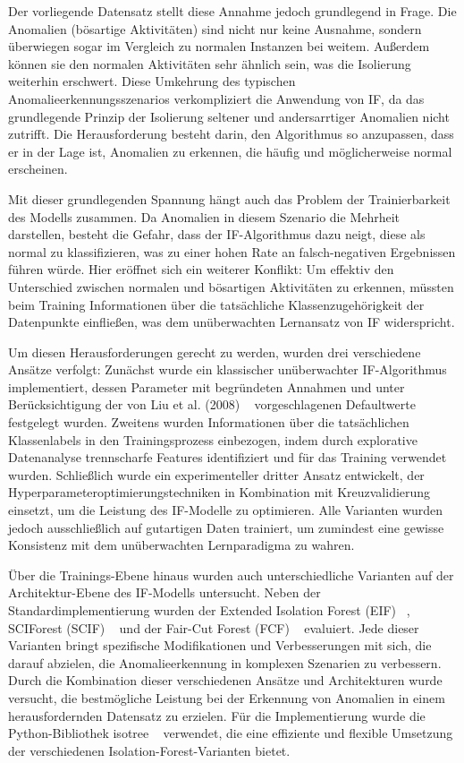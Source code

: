\documentclass[12pt,oneside]{article}
\begin{document}
	Der vorliegende Datensatz stellt diese Annahme jedoch grundlegend in Frage. Die Anomalien (bösartige Aktivitäten) sind nicht nur keine Ausnahme, sondern überwiegen sogar im Vergleich zu normalen Instanzen bei weitem. Außerdem können sie den normalen Aktivitäten sehr ähnlich sein, was die Isolierung weiterhin erschwert. Diese Umkehrung des typischen Anomalieerkennungsszenarios verkompliziert die Anwendung von IF, da das grundlegende Prinzip der Isolierung seltener und andersarrtiger Anomalien nicht zutrifft. Die Herausforderung besteht darin, den Algorithmus so anzupassen, dass er in der Lage ist, Anomalien zu erkennen, die häufig und möglicherweise normal erscheinen.

	Mit dieser grundlegenden Spannung hängt auch das Problem der Trainierbarkeit des Modells zusammen. Da Anomalien in diesem Szenario die Mehrheit darstellen, besteht die Gefahr, dass der IF-Algorithmus dazu neigt, diese als normal zu klassifizieren, was zu einer hohen Rate an falsch-negativen Ergebnissen führen würde.
	Hier eröffnet sich ein weiterer Konflikt: Um effektiv den Unterschied zwischen normalen und bösartigen Aktivitäten zu erkennen, müssten beim Training Informationen über die tatsächliche Klassenzugehörigkeit der Datenpunkte einfließen, was dem unüberwachten Lernansatz von IF widerspricht.

	Um diesen Herausforderungen gerecht zu werden, wurden drei verschiedene Ansätze verfolgt: Zunächst wurde ein klassischer unüberwachter IF-Algorithmus implementiert, dessen Parameter mit begründeten Annahmen und unter Berücksichtigung der von Liu et al. (2008) ~\cite{Liu2008} vorgeschlagenen Defaultwerte festgelegt wurden. Zweitens wurden Informationen über die tatsächlichen Klassenlabels in den Trainingsprozess einbezogen, indem durch explorative Datenanalyse trennscharfe Features identifiziert und für das Training verwendet wurden. Schließlich wurde ein experimenteller dritter Ansatz entwickelt, der Hyperparameteroptimierungstechniken in Kombination mit Kreuzvalidierung einsetzt, um die Leistung des IF-Modelle zu optimieren. Alle Varianten wurden jedoch ausschließlich auf gutartigen Daten trainiert, um zumindest eine gewisse Konsistenz mit dem unüberwachten Lernparadigma zu wahren.

	Über die Trainings-Ebene hinaus wurden auch unterschiedliche Varianten auf der Architektur-Ebene des IF-Modells untersucht. Neben der Standardimplementierung wurden der Extended Isolation Forest (EIF) ~\cite{Hariri2021}, SCIForest (SCIF) ~\cite{Liu2010} und der Fair-Cut Forest (FCF) ~\cite{cortes2021} evaluiert. Jede dieser Varianten bringt spezifische Modifikationen und Verbesserungen mit sich, die darauf abzielen, die Anomalieerkennung in komplexen Szenarien zu verbessern. Durch die Kombination dieser verschiedenen Ansätze und Architekturen wurde versucht, die bestmögliche Leistung bei der Erkennung von Anomalien in einem herausfordernden Datensatz zu erzielen. Für die Implementierung wurde die Python-Bibliothek isotree ~\cite{CortesIsotreePython} verwendet, die eine effiziente und flexible Umsetzung der verschiedenen Isolation-Forest-Varianten bietet.
\end{document}
